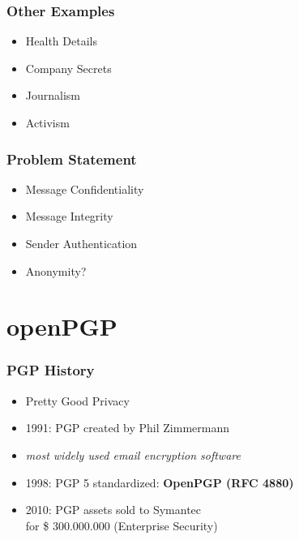 \documentclass{beamer}
\begin{document}

\begin{frame}
	\frametitle{Other Examples}
	
	\begin{itemize}
		\item Health Details
		\item Company Secrets
		\item Journalism
		\item Activism
	\end{itemize}

\end{frame}


\begin{frame}
	\frametitle{Problem Statement}

	\begin{itemize}
		\item Message Confidentiality
		\item Message Integrity
		\item Sender Authentication
		\item Anonymity?
	\end{itemize}

\end{frame}

\section{openPGP}


\begin{frame}
	\frametitle{PGP History}

	\begin{itemize}
		\item Pretty Good Privacy
		\item 1991: PGP created by Phil Zimmermann 
		\item \textit{most widely used email encryption software} \cite{zimmermann}
		\item 1998: PGP 5 standardized: \textbf{OpenPGP (RFC 4880)}
		\item 2010: PGP assets sold to Symantec \\ for \$ 300.000.000 (Enterprise Security)
	\end{itemize}
	

\end{frame}
\end{document}
